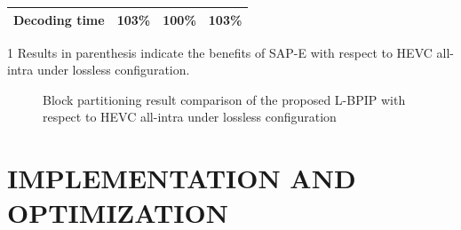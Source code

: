 \documentclass[journal]{IEEEtran}
\begin{document}
\begin{table}[tp]
\begin{tabular}{c|c|c|c|cccc}
        \multicolumn{2}{c|}{Decoding time}                & 103\%                     & 100\%    & \multicolumn{4}{c}{103\%}                                                                                     \\ \bottomrule
    \end{tabular}
    \begin{tablenotes}
        \footnotesize
        \item[1]Results in parenthesis \cite{13} indicate the benefits of SAP-E \cite{12}       with respect to HEVC all-intra under lossless configuration.
    \end{tablenotes}

\end{table}



\begin{figure}[tp]
    \centering
    \caption{Block partitioning result comparison of the proposed L-BPIP with respect to HEVC all-intra under lossless configuration}
    \label{fig:HEVC block}
\end{figure}

\section{IMPLEMENTATION AND OPTIMIZATION}
\end{document}
